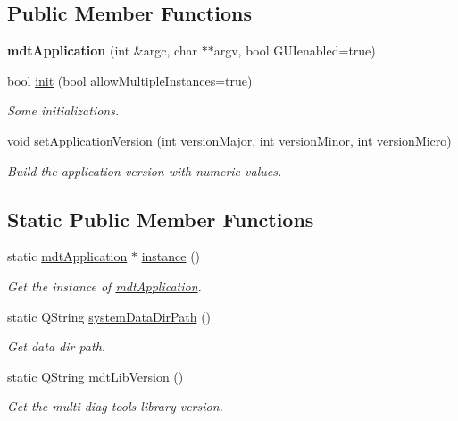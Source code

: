 \subsection*{Public Member Functions}
\begin{DoxyCompactItemize}
\item 
\hypertarget{classmdt_application_ab6268414770ee9239c83677c15a67f75}{
{\bfseries mdtApplication} (int \&argc, char $\ast$$\ast$argv, bool GUIenabled=true)}
\label{classmdt_application_ab6268414770ee9239c83677c15a67f75}

\item 
bool \hyperlink{classmdt_application_a5000b9656a59b3594de2a4ceb4232673}{init} (bool allowMultipleInstances=true)
\begin{DoxyCompactList}\small\item\em Some initializations. \end{DoxyCompactList}\item 
void \hyperlink{classmdt_application_a79dbb5f3d889d7cd9b8909a4eb8bcce1}{setApplicationVersion} (int versionMajor, int versionMinor, int versionMicro)
\begin{DoxyCompactList}\small\item\em Build the application version with numeric values. \end{DoxyCompactList}\end{DoxyCompactItemize}
\subsection*{Static Public Member Functions}
\begin{DoxyCompactItemize}
\item 
static \hyperlink{classmdt_application}{mdtApplication} $\ast$ \hyperlink{classmdt_application_a365ac79934070b0e5a42d2c7cd9b076d}{instance} ()
\begin{DoxyCompactList}\small\item\em Get the instance of \hyperlink{classmdt_application}{mdtApplication}. \end{DoxyCompactList}\item 
\hypertarget{classmdt_application_af17bb16e420c91af3d0ad1970714388c}{
static QString \hyperlink{classmdt_application_af17bb16e420c91af3d0ad1970714388c}{systemDataDirPath} ()}
\label{classmdt_application_af17bb16e420c91af3d0ad1970714388c}

\begin{DoxyCompactList}\small\item\em Get data dir path. \end{DoxyCompactList}\item 
\hypertarget{classmdt_application_ad5318086812dad2c2870e294703caa51}{
static QString \hyperlink{classmdt_application_ad5318086812dad2c2870e294703caa51}{mdtLibVersion} ()}
\label{classmdt_application_ad5318086812dad2c2870e294703caa51}

\begin{DoxyCompactList}\small\item\em Get the multi diag tools library version. \end{DoxyCompactList}\end{DoxyCompactItemize}


